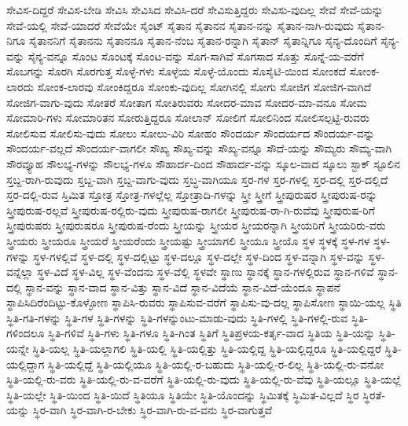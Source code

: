 {ಸೇವಿಸ-ದಿದ್ದರೆ
ಸೇವಿಸ-ಬೇಡಿ
ಸೇವಿಸಿ
ಸೇವಿಸಿದ
ಸೇವಿಸಿ-ದರೆ
ಸೇವಿಸುತ್ತಿದ್ದರು
ಸೇವಿಸು-ವುದಿಲ್ಲ
ಸೇವೆ
ಸೇವೆ-ಯನ್ನು
ಸೇವೆ-ಯಲ್ಲಿ
ಸೇವೆ-ಯಾದರೆ
ಸೇವೆಯೇ
ಸೈಂಟ್
ಸೈತಾನ
ಸೈತಾನನ
ಸೈತಾನ-ನನ್ನು
ಸೈತಾನ-ನಾಗಿ-ರುವುದು
ಸೈತಾನ-ನಿಗೂ
ಸೈತಾನನಿಗೆ
ಸೈತಾನನು
ಸೈತಾನನೂ
ಸೈತಾನ-ನೆಂಬ
ಸೈತಾನ-ರನ್ನಾಗಿ
ಸೈತಾನ್
ಸೈತಾನ್ನಿಗೂ
ಸೈನ್ಯ-ದೊಂದಿಗೆ
ಸೈನ್ಯ-ವನ್ನು
ಸೈನ್ಯ-ವನ್ನೂ
ಸೊಂಟ
ಸೊಂಟಕ್ಕೆ
ಸೊಂಟ-ವನ್ನು
ಸೊಗ-ಸಾಗಿವೆ
ಸೊಗಸಾದ
ಸೊತ್ತು
ಸೊನ್ನೆ-ಯ-ವರೆಗೆ
ಸೊಬಗನ್ನು
ಸೊರಗಿ
ಸೊರಗುತ್ತ
ಸೊಳ್ಳೆ-ಗಳು
ಸೊಳ್ಳೆಯ
ಸೊಳ್ಳೆ-ಯೊಂದು
ಸೊಸೈಟಿ-ಯಿಂದ
ಸೋಂಕದೆ
ಸೋಂಕ-ಲಾರದು
ಸೋಂಕ-ಲಾರವು
ಸೋಂಕಿದ್ದರೂ
ಸೋಂಕು-ವುದಿಲ್ಲ
ಸೋಗಿನಲ್ಲಿ
ಸೋಗು
ಸೋಜಿಗ
ಸೋಜಿಗ-ವಾಗಿದೆ
ಸೋಜಿಗ-ವಾಗು-ವುದು
ಸೋತರೆ
ಸೋತಾಗ
ಸೋತಿರುವರು
ಸೋದರ-ಮಾವ
ಸೋದರ-ಮಾ-ವನೂ
ಸೋಮ
ಸೋಮಾರಿ-ಗಳು
ಸೋಮಾರಿತನ
ಸೋರುತ್ತಿದ್ದರೂ
ಸೋಲಾನ್
ಸೋಲಿಗೆ
ಸೋಲಿನಿಂದ
ಸೋಲಿಸಲ್ಪಟ್ಟಿ-ರುವರು
ಸೋಲಿಸುವ
ಸೋಲಿಸು-ವುದು
ಸೋಲು
ಸೋಲು-ವಿರಿ
ಸೋಹಂ
ಸೌಂದರ್ಯ
ಸೌಂದರ್ಯದ
ಸೌಂದರ್ಯ-ವನ್ನು
ಸೌಂದರ್ಯ-ವಲ್ಲದೆ
ಸೌಂದರ್ಯ-ವಾಗಲೀ
ಸೌಖ್ಯ
ಸೌಖ್ಯ-ವನ್ನು
ಸೌಖ್ಯ-ವನ್ನೂ
ಸೌದೆ-ಯನ್ನು
ಸೌಮ್ಯರು
ಸೌಮ್ಯ-ವಾಗಿ
ಸೌರವ್ಯೂಹ
ಸೌಲಭ್ಯ-ಗಳನ್ನು
ಸೌಲಭ್ಯ-ಗಳೂ
ಸೌಹಾರ್ದ-ದಿಂದ
ಸೌಹಾರ್ದ-ವನ್ನು
ಸ್ಕೂಲ-ವಾದ
ಸ್ಕೂಲು
ಸ್ಟಾಕ್
ಸ್ಟೂಲಿನ
ಸ್ತಬ್ದ-ರಾಗಿ-ರುವುದು
ಸ್ತಬ್ದ-ವಾಗಿ
ಸ್ತಬ್ದ-ವಾಗು-ವುದು
ಸ್ತಬ್ಧ-ವಾಗಿಯೂ
ಸ್ತರ-ಗಳ
ಸ್ತರ-ಗಳಲ್ಲಿ
ಸ್ತರ-ದಲ್ಲಿ
ಸ್ತರ-ದಲ್ಲಿದೆ
ಸ್ತರ-ದಲ್ಲಿ-ರುವ
ಸ್ತಿಮಿತ
ಸ್ತೋತ್ರ
ಸ್ತೋತ್ರ-ಗಳಲ್ಲೆಲ್ಲ
ಸ್ತೋತ್ರಾದಿ-ಗಳನ್ನು
ಸ್ತ್ರೀ
ಸ್ತ್ರೀಗೆ
ಸ್ತ್ರೀಪುರುಷರ
ಸ್ತ್ರೀಪುರುಷ-ರನ್ನು
ಸ್ತ್ರೀಪುರುಷ-ರಲ್ಲವೆ
ಸ್ತ್ರೀಪುರುಷ-ರಲ್ಲಿರು-ವುದು
ಸ್ತ್ರೀಪುರುಷ-ರಾಗಲೀ
ಸ್ತ್ರೀಪುರುಷ-ರಾ-ಗಿ-ರುವೆವು
ಸ್ತ್ರೀಪುರುಷ-ರಿಗೆ
ಸ್ತ್ರೀಪುರುಷರು
ಸ್ತ್ರೀಪುರುಷರೂ
ಸ್ತ್ರೀಪುರುಷ-ರೆಂದು
ಸ್ತ್ರೀಯನ್ನು
ಸ್ತ್ರೀಯರ
ಸ್ತ್ರೀಯರನ್ನಾಗಿ
ಸ್ತ್ರೀಯರಿಗೆ
ಸ್ತ್ರೀಯರಿರು-ವರು
ಸ್ತ್ರೀಯರು
ಸ್ತ್ರೀಯರೂ
ಸ್ತ್ರೀಯರೆ
ಸ್ತ್ರೀಯರೆಂದು
ಸ್ತ್ರೀಯಷ್ಟು
ಸ್ತ್ರೀಯಾಗಲಿ
ಸ್ತ್ರೀಯೂ
ಸ್ತ್ರೀಯೊ
ಸ್ಥಳ
ಸ್ಥಳಕ್ಕೆ
ಸ್ಥಳ-ಗಳ
ಸ್ಥಳ-ಗಳನ್ನು
ಸ್ಥಳ-ಗಳಲ್ಲಿವೆ
ಸ್ಥಳ-ದಲ್ಲಿ
ಸ್ಥಳ-ದಲ್ಲಿಟ್ಟು
ಸ್ಥಳ-ದಲ್ಲೂ
ಸ್ಥಳ-ದಲ್ಲೇ
ಸ್ಥಳ-ದಿಂದ
ಸ್ಥಳ-ವನ್ನಾಗಿ
ಸ್ಥಳ-ವನ್ನು
ಸ್ಥಳ-ವನ್ನೆಲ್ಲಾ
ಸ್ಥಳ-ವಿದೆ
ಸ್ಥಳ-ವಿಲ್ಲ
ಸ್ಥಳ-ವೆಂದನು
ಸ್ಥಳ-ವೆಲ್ಲಿ
ಸ್ಥಳವೇ
ಸ್ಥಾಣು
ಸ್ಥಾನಕ್ಕೆ
ಸ್ಥಾನ-ಗಳಲ್ಲಿರುವ
ಸ್ಥಾನ-ಗಳಿವೆ
ಸ್ಥಾನ-ದಲ್ಲಿ
ಸ್ಥಾನ-ವನ್ನು
ಸ್ಥಾನ-ವಾದ
ಸ್ಥಾನ-ವಿತ್ತು
ಸ್ಥಾನ-ವಿದೆ
ಸ್ಥಾನ-ವಿದೆಯೆ
ಸ್ಥಾನ-ವಿದೆ-ಯೆಂದೂ
ಸ್ಥಾಪನೆ
ಸ್ಥಾಪಿಸಿದಿರೆಂದಿಟ್ಟು-ಕೊಳ್ಳೋಣ
ಸ್ಥಾಪಿಸಿ-ರುವರು
ಸ್ಥಾಪಿಸುವ-ವರೆಗೆ
ಸ್ಥಾಪಿಸು-ವು-ದಲ್ಲ
ಸ್ಥಾಪಿಸೋಣ
ಸ್ಥಾಯಿ-ಯಲ್ಲ
ಸ್ಥಿತಿ
ಸ್ಥಿತಿ-ಗತಿ-ಗಳನ್ನು
ಸ್ಥಿತಿ-ಗಳ
ಸ್ಥಿತಿ-ಗಳನ್ನು
ಸ್ಥಿತಿ-ಗಳನ್ನುಂಟು-ಮಾಡು-ವುದು
ಸ್ಥಿತಿ-ಗಳಲ್ಲಿ
ಸ್ಥಿತಿ-ಗಳಲ್ಲಿ-ರುವ
ಸ್ಥಿತಿ-ಗಳಿಂದಲೂ
ಸ್ಥಿತಿ-ಗಳಿವೆ
ಸ್ಥಿತಿ-ಗಳು
ಸ್ಥಿತಿ-ಗಳೂ
ಸ್ಥಿತಿ-ಗಿಂತ
ಸ್ಥಿತಿಗೆ
ಸ್ಥಿತಿಪ್ರಳಯ-ಕರ್ತೃ-ವಾದ
ಸ್ಥಿತಿಯ
ಸ್ಥಿತಿ-ಯನ್ನು
ಸ್ಥಿತಿ-ಯನ್ನೇ
ಸ್ಥಿತಿ-ಯಲ್ಲ
ಸ್ಥಿತಿ-ಯಲ್ಲಾಗಲಿ
ಸ್ಥಿತಿ-ಯಲ್ಲಿ
ಸ್ಥಿತಿ-ಯಲ್ಲಿತ್ತು
ಸ್ಥಿತಿ-ಯಲ್ಲಿದ್ದ
ಸ್ಥಿತಿ-ಯಲ್ಲಿದ್ದರೂ
ಸ್ಥಿತಿ-ಯಲ್ಲಿದ್ದರೆ
ಸ್ಥಿತಿ-ಯಲ್ಲಿದ್ದಾಗ
ಸ್ಥಿತಿ-ಯಲ್ಲಿದ್ದೆ
ಸ್ಥಿತಿ-ಯಲ್ಲಿಯೂ
ಸ್ಥಿತಿ-ಯಲ್ಲಿ-ರ-ಬಹುದು
ಸ್ಥಿತಿ-ಯಲ್ಲಿ-ರ-ಲಿಲ್ಲ
ಸ್ಥಿತಿ-ಯಲ್ಲಿ-ರು-ವನೋ
ಸ್ಥಿತಿ-ಯಲ್ಲಿ-ರು-ವರು
ಸ್ಥಿತಿ-ಯಲ್ಲಿ-ರು-ವ-ವರೆಗೆ
ಸ್ಥಿತಿ-ಯಲ್ಲಿ-ರು-ವುದು
ಸ್ಥಿತಿ-ಯಲ್ಲಿ-ರು-ವೆವು
ಸ್ಥಿತಿ-ಯಲ್ಲೂ
ಸ್ಥಿತಿ-ಯಲ್ಲೆ
ಸ್ಥಿತಿ-ಯಲ್ಲೇ
ಸ್ಥಿತಿ-ಯಿಂದ
ಸ್ಥಿತಿ-ಯಿದೆ
ಸ್ಥಿತಿಯೂ
ಸ್ಥಿತಿಯೇ
ಸ್ಥಿತಿ-ಯೊಂದನ್ನು
ಸ್ಥಿಮಿತಕ್ಕೆ
ಸ್ಥಿಮಿತ-ವಿಲ್ಲದೆ
ಸ್ಥಿರ
ಸ್ಥಿರತೆ-ಯನ್ನು
ಸ್ಥಿರ-ವಾಗಿ
ಸ್ಥಿರ-ವಾಗಿ-ರ-ಬೇಕು
ಸ್ಥಿರ-ವಾಗಿ-ರು-ವ-ವನು
ಸ್ಥಿರ-ವಾಗುತ್ತವೆ
}
